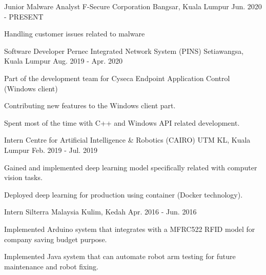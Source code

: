 

\begin{cventries}


\cventry
  {Junior Malware Analyst}
  {F-Secure Corporation}
  {Bangsar, Kuala Lumpur}
  {Jun. 2020 - PRESENT}
  {
    \begin{cvitems}
      \item {Handling customer issues related to malware}
    \end{cvitems}
  }

\cventry
  {Software Developer}
  {Pernec Integrated Network System (PINS)}
  {Setiawangsa, Kuala Lumpur}
  {Aug. 2019 - Apr. 2020}
  {
    \begin{cvitems}
      \item {Part of the development team for Cyseca Endpoint Application Control (Windows client)}
      \item {Contributing new features to the Windows client part.}
      \item {Spent most of the time with C++ and Windows API related development.}
    \end{cvitems}
  }

\cventry
  {Intern}
  {Centre for Artificial Intelligence \& Robotics (CAIRO)}
  {UTM KL, Kuala Lumpur}
  {Feb. 2019 - Jul. 2019}
  {
    \begin{cvitems}
      \item {Gained and implemented deep learning model specifically related with computer vision tasks.}
      \item {Deployed deep learning for production using container (Docker technology).}
    \end{cvitems}
  }

\cventry
  {Intern}
  {Silterra Malaysia}
  {Kulim, Kedah}
  {Apr. 2016 - Jun. 2016}
  {
    \begin{cvitems}
      \item {Implemented Arduino system that integrates with a MFRC522 RFID model for company saving budget purpose.}
      \item {Implemented Java system that can automate robot arm testing for future maintenance and robot fixing.}
    \end{cvitems}
  }

\end{cventries}
